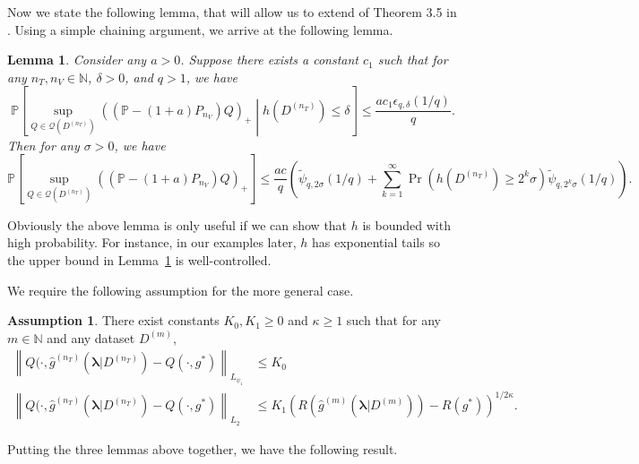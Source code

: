 \documentclass[10pt]{book}
\newtheorem{lemma}{Lemma}
\theoremstyle{definition}
\newtheorem{assump}{Assumption}
\begin{document}
Now we state the following lemma, that will allow us to extend of Theorem 3.5 in \citet{lecue2012oracle}.
Using a simple chaining argument, we arrive at the following lemma.
\begin{lemma}
	\label{lemma:chain}
Consider any $a>0$.
Suppose there exists a constant $c_{1}$ such that for any $n_{T},n_{V} \in \mathbb{N}$, $\delta>0$,
and $q>1$, we have
\[
\mathbb{P}\left[
\sup_{Q\in\mathcal{Q}(D^{(n_{T})})}\left(\left(\mathbb{P}-(1+a)P_{n_{V}}\right)Q\right)_{+}
\middle | 
h\left(D^{(n_{T})}\right)\le\delta\right]
\le\frac{ac_{1}\epsilon_{q,\delta}(1/q)}{q}.
\]
Then for any $\sigma > 0$, we have
\[
\mathbb{P}\left[\sup_{Q\in\mathcal{Q}(D^{(n_{T})})}\left(\left(\mathbb{P}-(1+a)P_{n_{V}}\right)Q\right)_{+}\right]
\le
\frac{ac}{q}
\left(
\tilde{\psi}_{q,2\sigma}(1/q)
+\sum_{k=1}^{\infty}\Pr\left(h\left(D^{(n_{T})}\right)\ge2^{k}\sigma\right)
\tilde{\psi}_{q,2^{k}\sigma}(1/q)
\right)
.
\]
\end{lemma}
Obviously the above lemma is only useful if we can show that $h$ is bounded with high probability.
For instance, in our examples later, $h$ has exponential tails so the upper bound in Lemma~\ref{lemma:chain} is well-controlled.

We require the following assumption for the more general case.
\begin{assump}
	\label{assump:tail_margin_general}
	There exist constants $K_0, K_1 \ge 0$ and $\kappa \ge 1$ such that for any $m \in \mathbb{N}$ and any dataset $D^{(m)}$,
	\begin{align}
	\left \| Q(\cdot, \hat{g}^{(n_T)}(\boldsymbol{\lambda} | D^{(n_T)}) - Q(\cdot, g^*) \right \|_{L_{\psi_1}} & \le K_0
	\label{eq:cv_assump1}\\
	\left \| Q(\cdot, \hat{g}^{(n_T)}(\boldsymbol{\lambda} | D^{(n_T)}) - Q(\cdot, g^*)  \right \|_{L_2}
	& \le 
	K_1 \left ( R(\hat{g}^{(m)}(\boldsymbol{\lambda}|D^{(m)})) - R(g^*) \right )^{1/2\kappa}.
	\label{eq:cv_assump2}
	\end{align}
\end{assump}

Putting the three lemmas above together, we have the following result.
\end{document}
